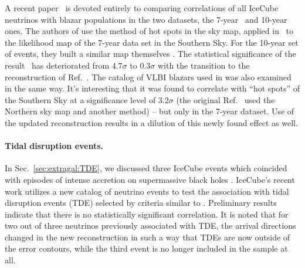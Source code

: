 \documentclass[a4paper,noshowpacs,noshowkeys,floatfix,twocolumn,preprintnumbers,nofootinbib]{revtex4-2}
\begin{document}
A recent paper~\cite{Disappearing-corr} is devoted entirely to comparing correlations of all IceCube neutrinos with  blazar populations in the two datasets, the 7-year~\cite{IceCube7yrSources} and 10-year~\cite{IceCube10yrDataPaper} ones. The authors of \cite{Disappearing-corr} use the method of hot spots in the sky map, applied in~\cite{Buson1} to the likelihood map of the 7-year data set in the Southern Sky. For the 10-year set of events, they built a similar map themselves \cite{Disappearing-corr}. The statistical significance of the result~\cite{Buson1} has deteriorated from $4.7\sigma$ to $0.3\sigma$ with the transition to the reconstruction of Ref.~\cite{IceCube10yrDataPaper}. The catalog of VLBI blazars used in \cite{neutradio2} was also examined in the same way. It's interesting that it was found \cite{Disappearing-corr} to correlate with ``hot spots'' of the Southern Sky at a significance level of $3.2\sigma$ (the original Ref.~\cite{neutradio2} used the Northern sky map and another method) -- but only in the 7-year dataset. Use of the updated reconstruction \cite{IceCube10yrDataPaper} results in a dilution of this newly found effect as well.

\paragraph{Tidal disruption events.}
In Sec.~\ref{sec:extragal:TDE}, we discussed three IceCube events which coincided with episodes of intense accretion on supermassive black holes \cite{TDEcorr2021}. IceCube's recent work \cite{IceCube-TDE-ICRC2023} utilizes a new catalog of neutrino events to test the association with tidal disruption events (TDE) selected by criteria similar to \cite{TDEcorr2021}. Preliminary results indicate that there is no statistically significant correlation. It is noted that for two out of three neutrinos previously associated with TDE, the arrival directions changed in the new reconstruction in such a way that TDEs are now outside of the error contours, while the third event is no longer included in the sample at all.
\end{document}
